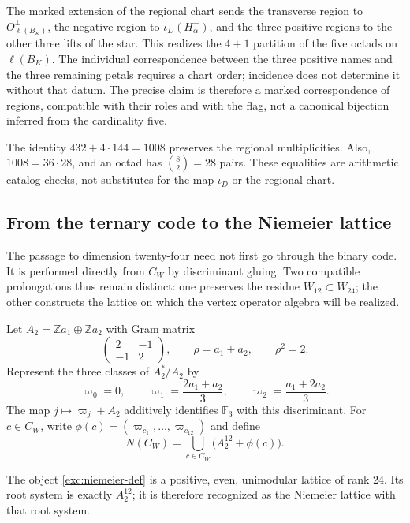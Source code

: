 The marked extension of the regional chart sends the transverse region
to $O_{\ell(B_K)}^\perp$, the negative region to $\iota_D(H^-_\alpha)$, and the
three positive regions to the other three lifts of the star. This
realizes the $4+1$ partition of the five octads on $\ell(B_K)$.
The individual correspondence between the three positive names and
the three remaining petals requires a chart order; incidence does not
determine it without that datum. The precise claim is therefore a
marked correspondence of regions, compatible with their roles and with
the flag, not a canonical bijection inferred from the cardinality five.

The identity $432+4\cdot144=1008$ preserves the regional
multiplicities. Also, $1008=36\cdot28$, and an octad has
$\binom82=28$ pairs. These equalities are arithmetic catalog
checks, not substitutes for the map $\iota_D$ or the regional chart.



\subsection{From the ternary code to the Niemeier lattice}
\label{exc:niemeier}

The passage to dimension twenty-four need not first go through the
binary code. It is performed directly from $C_W$ by discriminant
gluing. Two compatible prolongations thus remain distinct:
one preserves the residue $W_{12}\subset W_{24}$; the other constructs the
lattice on which the vertex operator algebra will be realized.

Let $A_2=\mathbb Z a_1\oplus\mathbb Z a_2$ with Gram matrix
\[
 \begin{pmatrix}2&-1\\-1&2\end{pmatrix},
 \qquad \rho=a_1+a_2,\qquad \rho^2=2.
\]
Represent the three classes of $A_2^*/A_2$ by
\[
 \varpi_0=0,\qquad
 \varpi_1=\frac{2a_1+a_2}{3},\qquad
 \varpi_2=\frac{a_1+2a_2}{3}.
\]
The map $j\mapsto\varpi_j+A_2$ additively identifies
$\mathbb F_3$ with this discriminant. For $c\in C_W$, write
$\phi(c)=(\varpi_{c_1},\ldots,\varpi_{c_{12}})$ and define
\begin{equation}
 N(C_W)=\bigcup_{c\in C_W}\bigl(A_2^{12}+\phi(c)\bigr).
 \label{exc:niemeier-def}
\end{equation}

\begin{theorem}
\label{exc:niemeier-teorema}
The object \eqref{exc:niemeier-def} is a positive, even,
unimodular lattice of rank $24$. Its root system is exactly
$A_2^{12}$; it is therefore recognized as the Niemeier lattice with
that root system.
\end{theorem}

